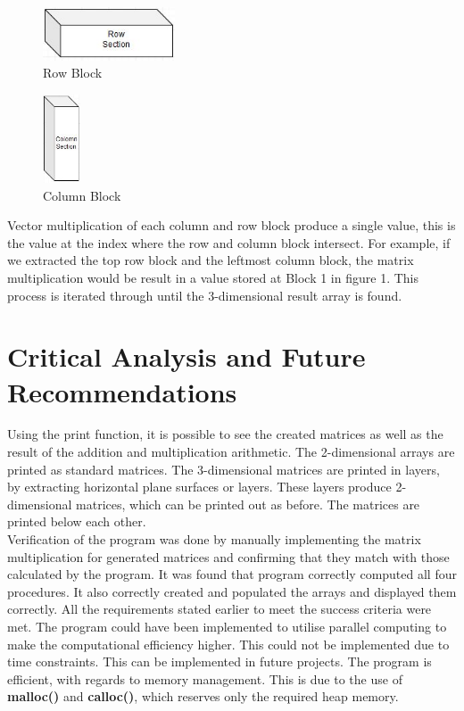 \documentclass[a4paper, 11pt, onecolumn, conference]{IEEEtran}      %
\begin{document}
\begin{figure}[H]
\centering
\includegraphics[width=0.35\textwidth]{RowBlock.JPG}%
\caption{Row Block}
\label{fig:3}
\end{figure}

\begin{figure}[H]
\centering
\includegraphics[width=0.1\textwidth]{ColomnBlock.JPG}%
\caption{Column Block}
\label{fig:3}
\end{figure}

Vector multiplication of each column and row block produce a single value, this is the value at the index where the row and column block intersect. For example, if we extracted the top row block and the leftmost column block, the matrix multiplication would be result in a value stored at Block 1 in figure 1. This process is iterated through until the 3-dimensional result array is found.

\section{Critical Analysis and Future Recommendations}

Using the print function, it is possible to see the created matrices as well as the result of the addition and multiplication arithmetic. The 2-dimensional arrays are printed as standard matrices. The 3-dimensional matrices are printed in layers, by extracting horizontal plane surfaces or layers. These layers produce 2-dimensional matrices, which can be printed out as before. The matrices are printed below each other. \\

Verification of the program was done by manually implementing the matrix multiplication for generated matrices and confirming that they match with those calculated by the program. It was found that program correctly computed all four procedures. It also correctly created and populated the arrays and displayed them correctly. All the requirements stated earlier to meet the success criteria were met. 
The program could have been implemented to utilise parallel computing to make the computational efficiency higher. This could not be implemented due to time constraints. This can be implemented in future projects.
The program is efficient, with regards to memory management. This is due to the use of \textbf{malloc()} and \textbf{calloc()}, which reserves only the required heap memory. \\
\end{document}
